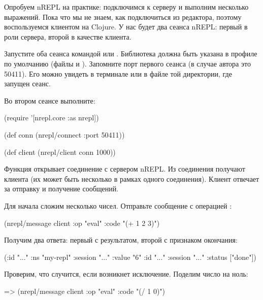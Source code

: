 Опробуем nREPL на практике: подключимся к серверу и выполним несколько выражений. Пока что мы не знаем, как подключиться из редактора, поэтому воспользуемся клиентом на Clojure. У нас будет два сеанса nREPL: первый в роли сервера, второй в качестве клиента.

Запустите оба сеанса командой  или . Библиотека  должна быть указана в профиле по умолчанию (файлы  и ). Запомните порт первого сеанса (в случае автора это 50411). Его можно увидеть в терминале или в файле  той директории, где запущен сеанс.

Во втором сеансе выполните:

\begin{english}
  \begin{clojure}
(require '[nrepl.core :as nrepl])

(def conn
  (nrepl/connect :port 50411))

(def client
  (nrepl/client conn 1000))
  \end{clojure}
\end{english}

Функция  открывает соединение с сервером nREPL. Из соединения получают клиента (их может быть несколько в рамках одного соединения). Клиент отвечает за отправку и получение сообщений.

Для начала сложим несколько чисел. Отправьте сообщение с операцией :

\begin{english}
  \begin{clojure}
(nrepl/message client
               {:op "eval" :code "(+ 1 2 3)"})
  \end{clojure}
\end{english}

Получим два ответа: первый с результатом, второй с признаком окончания:

\begin{english}
  \begin{clojure}
({:id "..."
  :ns "my-repl"
  :session "..."
  :value "6"}
 {:id "..."
  :session "..."
  :status ["done"]})
  \end{clojure}
\end{english}

Проверим, что случится, если возникнет исключение. Поделим число на ноль:

\begin{english}
  \begin{clojure}
=> (nrepl/message client
                  {:op "eval" :code "(/ 1 0)"})
  \end{clojure}
\end{english}

